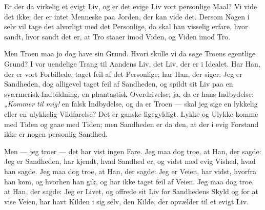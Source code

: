 \documentclass[12pt,a4paper]{book}
\newcommand{\apage}[1]{\marginnote{\footnotesize\textit{[#1]}}}
\begin{document}
Er der da virkelig et evigt Liv, og er det evige Liv vort personlige
Maal? Vi vide det ikke; der er intet Menneske paa Jorden, der kan
vide det. Dersom Nogen i selv vil tage det alvorligt med det
Personlige, da skal han visselig erfare, hvor sandt, hvor sandt det
er, at Tro staaer imod Viden, og Viden imod Tro.

Men Troen maa jo dog have sin Grund. Hvori skulle vi da søge
Troens egentlige Grund? I vor uendelige Trang til Aandens Liv, det
Liv, der er i Idealet. Har Han, der er vort Forbillede, taget feil af
det Personlige; har Han, der \apage{133}
siger: Jeg er Sandheden, dog alligevel taget feil af Sandheden, og
spildt sit Liv paa en sværmerisk Indbildning, en phantastisk
Overdrivelse; ja, da er hans Indbydelse: „\emph{Kommer til mig!} en
falsk Indbydelse, og da er Troen --- skal jeg sige en lykkelig eller en
ulykkelig Vildfarelse? Det er ganske ligegyldigt. Lykke og Ulykke
komme med Tiden og gaae med Tiden; men Sandheden er da den, at
der i evig Forstand ikke er nogen personlig Sandhed.

Men --- jeg troer --- det har vist ingen Fare. Jeg maa dog troe, at
Han, der sagde: Jeg er Sandheden, har kjendt, hvad Sandhed er, og
vidst med evig Vished, hvad han sagde. Jeg maa dog troe, at Han,
der sagde: Jeg er Veien, har vidst, hvorfra han kom, og hvorhen han
gik, og har ikke taget feil af Veien. Jeg maa dog troe, at Han, der
sagde: Jeg er Livet, og offrede sit Liv for Sandhedens Skyld og for
at vise Veien, har havt Kilden i sig selv, den Kilde, der opvælder til
et evigt Liv.
\end{document}
